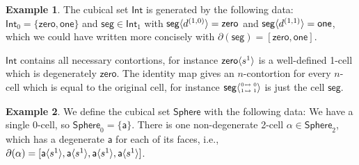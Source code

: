 \documentclass[11pt]{article}
\theoremstyle{definition}
\newtheorem{example}{Example}
\newcommand{\mlist}[1]{[ {#1} ]}
\newcommand{\smap}[1]{s^{{#1}}}
\newcommand{\dmap}[2]{d^{({#1} , {#2})}}
\newcommand{\cont}[2]{\ensuremath{ \ifthenelse{\equal{#2}{}}{#1}{{#1}\langle{#2}\rangle}} }
\newcommand{\cset}[1]{\ensuremath{\mathsf{{#1}}}}
\newcommand{\boundary}[1]{\partial({#1})}
\newcommand{\substtwo}[2]{\tiny
  \arraycolsep=.4pt\def\arraystretch{1}
  \begin{array}{ll}
    0 &\mapsto {#1} \\
    1 &\mapsto {#2}
  \end{array}
}
\newcommand{\oneid}{\substtwo{0}{1}}
\begin{document}



\begin{example}\label{exp:int}
  The cubical set $\cset{Int}$ is generated by the following data: $\cset{Int}_0
  = \{ \cset{zero} , \cset{one} \}$ and $\cset{seg} \in \cset{Int}_1$ with
  $\cont{\cset{seg}}{\dmap{1}{0}} = \cset{zero}$ and $\cont{\cset{seg}}{\dmap{1}{1}} =
  \cset{one}$, which we could have written more concisely with
  $\boundary{\cset{seg}} = \mlist{\cset{zero}, \cset{one}}$.

  $\cset{Int}$ contains all necessary contortions, for instance
  $\cont{\cset{zero}}{\smap{1}}$ is a well-defined 1-cell which is
  degenerately $\cset{zero}$.
  The identity map gives an $n$-contortion for every $n$-cell which is equal
  to the original cell, for instance $\cont{\cset{seg}}{\oneid}$ is just the cell
  $\cset{seg}$.


\end{example}

\begin{example}\label{exp:sndsphere}
  We define the cubical set $\cset{Sphere}$ with the following data: We have a
  single 0-cell, so $\cset{Sphere}_0 = \{
  \cset{a} \}$. There is one non-degenerate 2-cell $\cset{\alpha} \in
  \cset{Sphere}_2$, which has a degenerate $\cset{a}$ for each of its faces,
  i.e.,
  $\boundary{\cset{\alpha}} = \mlist{ \cont{\cset{a}}{\smap{1}},
    \cont{\cset{a}}{\smap{1}}, \cont{\cset{a}}{\smap{1}}, \cont{\cset{a}}{\smap{1}} }$.
\end{example}

\end{document}
